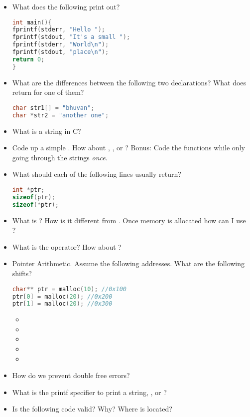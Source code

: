 \begin{itemize}
	\item
	      What does the following print out?

	      \begin{lstlisting}[language=C]
int main(){
fprintf(stderr, "Hello ");
fprintf(stdout, "It's a small ");
fprintf(stderr, "World\n");
fprintf(stdout, "place\n");
return 0;
}
\end{lstlisting}
	\item
	      What are the differences between the following two declarations? What
	      does  return for one of them?

	      \begin{lstlisting}[language=C]
char str1[] = "bhuvan";
char *str2 = "another one";
\end{lstlisting}
	\item
	      What is a string in C?
	\item
	      Code up a simple . How about , , or ? Bonus: Code the functions while only going through the strings \emph{once}.
	\item
	      What should each of the following lines usually return?

	      \begin{lstlisting}[language=C]
int *ptr;
sizeof(ptr);
sizeof(*ptr);
\end{lstlisting}
	\item
	      What is ? How is it different from . Once memory is allocated how can I use ?
	\item
	      What is the \keyword{\&} operator? How about \keyword{*}?
	\item
	      Pointer Arithmetic. Assume the following addresses. What are the following shifts?

	      \begin{lstlisting}[language=C]
char** ptr = malloc(10); //0x100
ptr[0] = malloc(20); //0x200
ptr[1] = malloc(20); //0x300
\end{lstlisting}

	      \begin{itemize}
		      \tightlist
		      \item
		      \item
		      \item
		      \item
		      \item
	      \end{itemize}
	\item
	      How do we prevent double free errors?
	\item
	      What is the printf specifier to print a string, , or
	      ?
	\item
	      Is the following code valid? Why? Where is 
	      located?


\end{itemize}
